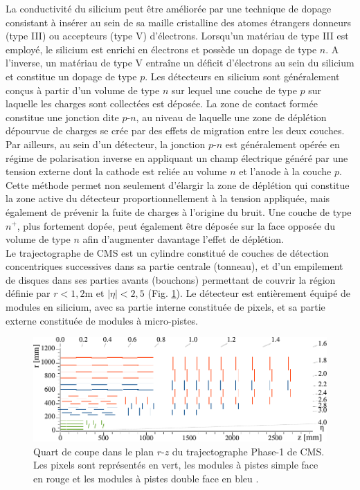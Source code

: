 La conductivité du silicium peut être améliorée par une technique de dopage consistant à insérer au sein de sa maille cristalline des atomes étrangers donneurs (type III) ou accepteurs (type V) d'électrons. Lorsqu'un matériau de type III est employé, le silicium est enrichi en électrons et possède un dopage de type $n$. A l'inverse, un matériau de type V entraîne un déficit d'électrons au sein du silicium et constitue un dopage de type $p$. Les détecteurs en silicium sont généralement conçus à partir d'un volume de type $n$ sur lequel une couche de type $p$ sur laquelle les charges sont collectées est déposée. La zone de contact formée constitue une jonction dite $p$-$n$, au niveau de laquelle une zone de déplétion dépourvue de charges se crée par des effets de migration entre les deux couches. Par ailleurs, au sein d'un détecteur, la jonction $p$-$n$ est généralement opérée en régime de polarisation inverse en appliquant un champ électrique généré par une tension externe dont la cathode est reliée au volume $n$ et l'anode à la couche $p$. Cette méthode permet non seulement d'élargir la zone de déplétion qui constitue la zone active du détecteur proportionnellement à la tension appliquée, mais également de prévenir la fuite de charges à l'origine du bruit. Une couche de type $n^+$, plus fortement dopée, peut également être déposée sur la face opposée du volume de type $n$ afin d'augmenter davantage l'effet de déplétion. \\

Le trajectographe de CMS est un cylindre constitué de couches de détection concentriques successives dans sa partie centrale (tonneau), et d'un empilement de disques dans ses parties avants (bouchons) permettant de couvrir la région définie par $r<1,2$m et $|\eta|<2,5$ (Fig. \ref{tracker}). Le détecteur est entièrement équipé de modules en silicium, avec sa partie interne constituée de pixels, et sa partie externe constituée de modules à micro-pistes. \\

\begin{figure}
\centering
    \includegraphics[scale=0.95]{Chapitre3/Images/Phase1_Tracker_1Quarter.png} 
\caption{Quart de coupe dans le plan $r$-$z$ du trajectographe Phase-1 de CMS. Les pixels sont représentés en vert, les modules à pistes simple face en rouge et les modules à pistes double face en bleu \cite{TrackerPerformance}.}
\label{tracker}
\end{figure}

